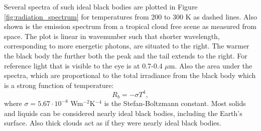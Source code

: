 \documentclass[12pt]{book}
\begin{document}
Several spectra of such ideal black bodies are plotted in Figure \ref{fig:radiation_spectrum} for temperatures from 200 to 300 K as dashed lines. Also shown is the emission spectrum from a tropical cloud free scene as measured from space. The plot is linear in wavenumber such that shorter wavelength, corresponding to more energetic photons, are situated to the right. The warmer the black body the further both the peak and the tail extends to the right. For reference light that is visible to the eye is at 0.7-0.4 $\mu$m. Also the area under the spectra, which are proportional to the total irradiance from the black body which is a strong function of temperature:
\begin{equation}
R_b = -\sigma T^4,
\label{eq:blackbody}
\end{equation}
\noindent where $\sigma=5.67\cdot 10^{-8}$ Wm$^{-2}$K$^{-4}$ is the Stefan-Boltzmann constant. Most solids and liquids can be considered nearly ideal black bodies, including the Earth's surface. Also thick clouds act as if they were nearly ideal black bodies.
\end{document}
